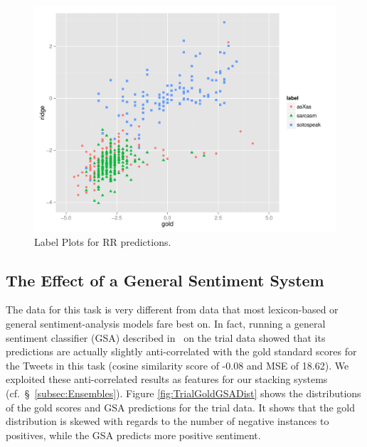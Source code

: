 \documentclass[11pt,letterpaper]{article}
\begin{document}

\begin{figure}[ht!]
    \centering
    \includegraphics[width=1.05\columnwidth]{trialplotv2.pdf}
    \caption{Label Plots for {\sc RR} predictions.}
    \label{fig:LabelPlot.Sarc.soto.asX}
\end{figure}


\subsection*{The Effect of a General Sentiment System}
The data for this task is very different from data that most lexicon-based or general sentiment-analysis models fare best on. In fact, running a general sentiment classifier (GSA) described in~ on the trial data showed that its predictions are actually slightly anti-correlated with the gold standard scores for the Tweets in this task (cosine similarity score of -0.08 and MSE of
18.62). We exploited these anti-correlated results as features for our stacking systems (cf.\ \S~\ref{subsec:Ensembles}). Figure \ref{fig:TrialGoldGSADist} shows the distributions of the gold scores and GSA predictions for the trial data. It shows that the gold distribution is skewed with regards to the number of negative instances to positives, while the GSA predicts more positive sentiment.
\end{document}
